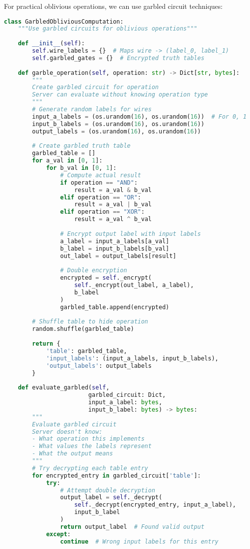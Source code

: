 For practical oblivious operations, we can use garbled circuit techniques:

\begin{lstlisting}[language=Python, caption={Garbled circuit approach}]
class GarbledObliviousComputation:
    """Use garbled circuits for oblivious operations"""
    
    def __init__(self):
        self.wire_labels = {}  # Maps wire -> (label_0, label_1)
        self.garbled_gates = {}  # Encrypted truth tables
        
    def garble_operation(self, operation: str) -> Dict[str, bytes]:
        """
        Create garbled circuit for operation
        Server can evaluate without knowing operation type
        """
        # Generate random labels for wires
        input_a_labels = (os.urandom(16), os.urandom(16))  # For 0, 1
        input_b_labels = (os.urandom(16), os.urandom(16))
        output_labels = (os.urandom(16), os.urandom(16))
        
        # Create garbled truth table
        garbled_table = []
        for a_val in [0, 1]:
            for b_val in [0, 1]:
                # Compute actual result
                if operation == "AND":
                    result = a_val & b_val
                elif operation == "OR":
                    result = a_val | b_val
                elif operation == "XOR":
                    result = a_val ^ b_val
                
                # Encrypt output label with input labels
                a_label = input_a_labels[a_val]
                b_label = input_b_labels[b_val]
                out_label = output_labels[result]
                
                # Double encryption
                encrypted = self._encrypt(
                    self._encrypt(out_label, a_label),
                    b_label
                )
                garbled_table.append(encrypted)
        
        # Shuffle table to hide operation
        random.shuffle(garbled_table)
        
        return {
            'table': garbled_table,
            'input_labels': (input_a_labels, input_b_labels),
            'output_labels': output_labels
        }
    
    def evaluate_garbled(self,
                        garbled_circuit: Dict,
                        input_a_label: bytes,
                        input_b_label: bytes) -> bytes:
        """
        Evaluate garbled circuit
        Server doesn't know:
        - What operation this implements
        - What values the labels represent
        - What the output means
        """
        # Try decrypting each table entry
        for encrypted_entry in garbled_circuit['table']:
            try:
                # Attempt double decryption
                output_label = self._decrypt(
                    self._decrypt(encrypted_entry, input_a_label),
                    input_b_label
                )
                return output_label  # Found valid output
            except:
                continue  # Wrong input labels for this entry
        

\end{lstlisting}
